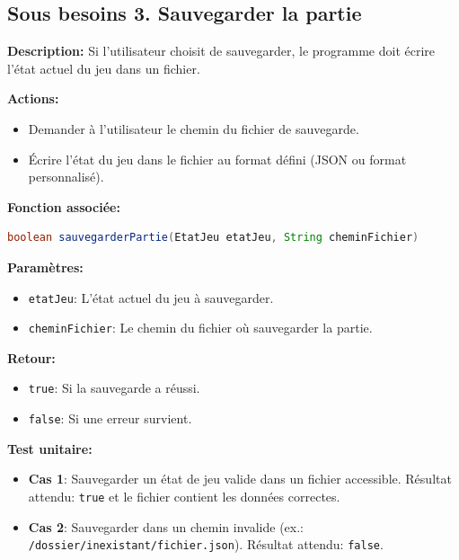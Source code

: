 \documentclass[a4paper]{article}
\begin{document}
\subsection*{Sous besoins 3. Sauvegarder la partie}
\begin{besoinbox}
\textbf{Description:}
Si l’utilisateur choisit de sauvegarder, le programme doit écrire l’état actuel du jeu dans un fichier.

\textbf{Actions:}
\begin{itemize}[leftmargin=2cm]
    \item Demander à l’utilisateur le chemin du fichier de sauvegarde.
    \item Écrire l’état du jeu dans le fichier au format défini (JSON ou format personnalisé).
\end{itemize}

\textbf{Fonction associée:}
\begin{lstlisting}[language=Java]
boolean sauvegarderPartie(EtatJeu etatJeu, String cheminFichier)
\end{lstlisting}

\textbf{Paramètres:}
\begin{itemize}[leftmargin=2cm]
    \item \texttt{etatJeu}: L'état actuel du jeu à sauvegarder.
    \item \texttt{cheminFichier}: Le chemin du fichier où sauvegarder la partie.
\end{itemize}

\textbf{Retour:}
\begin{itemize}[leftmargin=2cm]
    \item \texttt{true}: Si la sauvegarde a réussi.
    \item \texttt{false}: Si une erreur survient.
\end{itemize}

\textbf{Test unitaire:}
\begin{itemize}[leftmargin=2cm]
    \item \textbf{Cas 1}: Sauvegarder un état de jeu valide dans un fichier accessible. Résultat attendu: \texttt{true} et le fichier contient les données correctes.
    \item \textbf{Cas 2}: Sauvegarder dans un chemin invalide (ex.: \texttt{/dossier/inexistant/fichier.json}). Résultat attendu: \texttt{false}.
\end{itemize}
\end{besoinbox}
\end{document}
